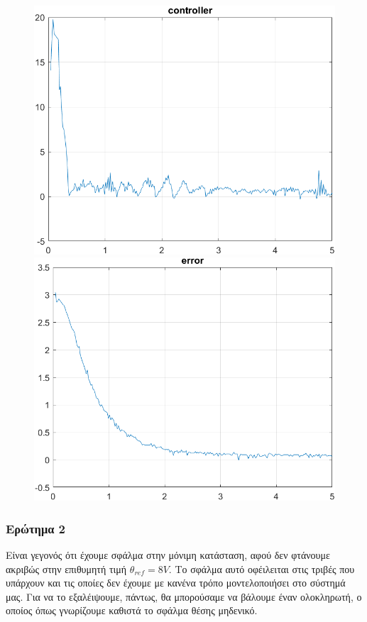 \begin{figure}[H]
    \begin{minipage}{0.45\textwidth}
        \includegraphics[width=\linewidth]{Images/lab2/1/con221.png}
    \end{minipage}
    \hfill
    \begin{minipage}{0.45\textwidth}
        \includegraphics[width=\linewidth]{Images/lab2/1/err221.png}
    \end{minipage}
\end{figure}

\subsubsection{Ερώτημα 2}
Είναι γεγονός ότι έχουμε σφάλμα στην μόνιμη κατάσταση, αφού δεν φτάνουμε ακριβώς στην επιθυμητή τιμή $θ_{ref} = 8V$. Το σφάλμα αυτό οφέιλειται στις τριβές που υπάρχουν και τις οποίες δεν έχουμε με κανένα τρόπο μοντελοποιήσει στο σύστημά μας. Για να το εξαλέιψουμε, πάντως, θα μπορούσαμε να βάλουμε έναν ολοκληρωτή, ο οποίος όπως γνωρίζουμε καθιστά το σφάλμα θέσης μηδενικό.

